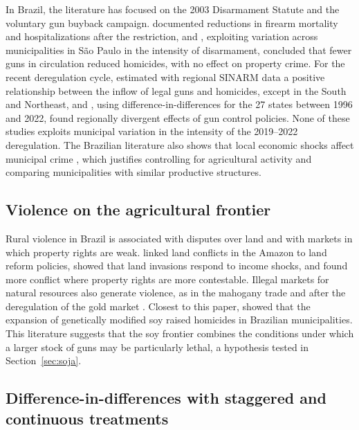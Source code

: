 \documentclass[11pt,a4paper]{article}
\begin{document}
In Brazil, the literature has focused on the 2003 Disarmament Statute and the voluntary gun buyback campaign. \citet{souza2007} documented reductions in firearm mortality and hospitalizations after the restriction, and \citet{cerqueira2012}, exploiting variation across municipalities in São Paulo in the intensity of disarmament, concluded that fewer guns in circulation reduced homicides, with no effect on property crime. For the recent deregulation cycle, \citet{baculi2021} estimated with regional SINARM data a positive relationship between the inflow of legal guns and homicides, except in the South and Northeast, and \citet{wakim2025}, using difference-in-differences for the 27 states between 1996 and 2022, found regionally divergent effects of gun control policies. None of these studies exploits municipal variation in the intensity of the 2019--2022 deregulation. The Brazilian literature also shows that local economic shocks affect municipal crime \citep{dixcarneiro2018}, which justifies controlling for agricultural activity and comparing municipalities with similar productive structures.

\subsection{Violence on the agricultural frontier}

Rural violence in Brazil is associated with disputes over land and with markets in which property rights are weak. \citet{alston2000} linked land conflicts in the Amazon to land reform policies, \citet{hidalgo2010} showed that land invasions respond to income shocks, and \citet{fetzer2017} found more conflict where property rights are more contestable. Illegal markets for natural resources also generate violence, as in the mahogany trade \citep{chimeli2017} and after the deregulation of the gold market \citep{pereira2026}. Closest to this paper, \citet{moreno2024} showed that the expansion of genetically modified soy raised homicides in Brazilian municipalities. This literature suggests that the soy frontier combines the conditions under which a larger stock of guns may be particularly lethal, a hypothesis tested in Section~\ref{sec:soja}.

\subsection{Difference-in-differences with staggered and continuous treatments}
\end{document}
